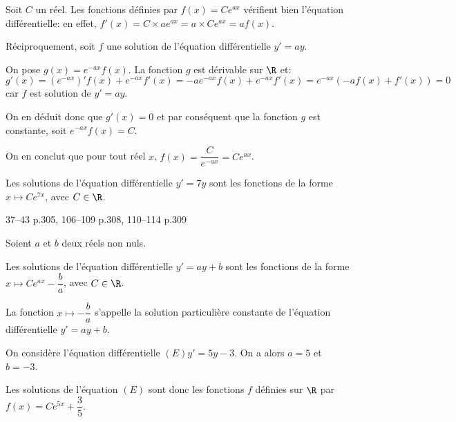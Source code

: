 \documentclass[a4paper]{article}
\begin{document}
    \begin{demonstrationp*}{}{}
      Soit $C$ un réel. Les fonctions définies par $f(x)=Ce^{ax}$ vérifient bien l'équation différentielle: en effet,
      $f'(x)=C\times a e^{ax}=a\times Ce^{ax}=af(x)$.

      Réciproquement, soit $f$ une solution de l'équation différentielle $y'=ay$.

      On pose $g(x)=e^{-ax}f(x)$. La fonction $g$ est dérivable sur $\R$ et: $g'(x)=(e^{-ax})'f(x)+e^{-ax}f'(x)=
      -a e^{-ax}f(x)+e^{-ax}f'(x)=e^{-ax}\left( -af(x)+f'(x)\right)=0$ car $f$ est solution de $y'=ay$.

      On en déduit donc que $g'(x)=0$ et par conséquent que la fonction $g$ est constante, soit $e^{-ax}f(x)=C$.

      On en conclut que pour tout réel $x$, $f(x)=\dfrac{C}{e^{-ax}}=Ce^{ax}$.
      \findemo{}
    \end{demonstrationp*}

    \begin{example}{}{}
    Les solutions de l'équation différentielle $y'=7y$ sont les fonctions de la forme $x\mapsto Ce^{7x}$, avec $C\in\R$.
    \end{example}

    \begin{exercices}{}{}
37--43 p.305, 106--109 p.308, 110--114 p.309
    \end{exercices}

    \begin{theoreme*}{}{}
      Soient $a$ et $b$ deux réels non nuls.

      Les solutions de l'équation différentielle $y'=ay+b$ sont les fonctions de la forme 
      $x \mapsto Ce^{ax}-\dfrac{b}{a}$, avec $C\in\R$.
    \end{theoreme*}

    \begin{remark}{}{}
    La fonction $x\mapsto -\dfrac{b}{a}$ s'appelle la solution particulière constante de l'équation différentielle $y'=ay+b$.
    \end{remark}

    \begin{example}{}{}
      On considère l'équation différentielle $(E) y'=5y-3$. On a alors $a=5$ et $b=-3$.

      Les solutions de l'équation $(E)$ sont donc les fonctions $f$ définies sur $\R$ par $f(x)=Ce^{5x}+\dfrac{3}{5}$.
    \end{example}
\end{document}
